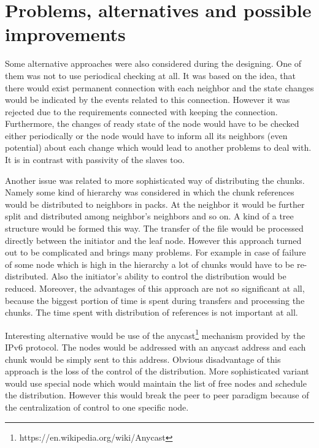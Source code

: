 \chapter{Problems, alternatives and possible
improvements}\label{problems-alternatives-and-possible-improvements}

Some alternative approaches were also considered during the designing.
One of them was not to use periodical checking at all. It was based on
the idea, that there would exist permanent connection with each neighbor
and the state changes would be indicated by the events related to this
connection. However it was rejected due to the requirements connected
with keeping the connection. Furthermore, the changes of ready state of
the node would have to be checked either periodically or the node would
have to inform all its neighbors (even potential) about each change
which would lead to another problems to deal with. It is in contrast
with passivity of the slaves too.

Another issue was related to more sophisticated way of distributing the
chunks. Namely some kind of hierarchy was considered in which the chunk
references would be distributed to neighbors in packs. At the neighbor
it would be further split and distributed among neighbor's neighbors and
so on. A kind of a tree structure would be formed this way. The transfer
of the file would be processed directly between the initiator and the
leaf node. However this approach turned out to be complicated and brings
many problems. For example in case of failure of some node which is high
in the hierarchy a lot of chunks would have to be re-distributed. Also
the initiator's ability to control the distribution would be reduced.
Moreover, the advantages of this approach are not so significant at all,
because the biggest portion of time is spent during transfers and
processing the chunks. The time spent with distribution of references is
not important at all.

Interesting alternative would be use of the
anycast\footnote{https://en.wikipedia.org/wiki/Anycast} mechanism
provided by the IPv6 protocol. The nodes would be addressed with an
anycast address and each chunk would be simply sent to this address.
Obvious disadvantage of this approach is the loss of the control of the
distribution. More sophisticated variant would use special node which
would maintain the list of free nodes and schedule the distribution.
However this would break the peer to peer paradigm because of the
centralization of control to one specific node.

